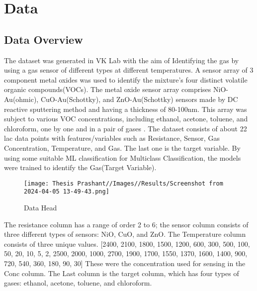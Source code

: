 
\chapter{Data}

\section{ Data Overview}
The dataset was generated in VK Lab with the aim of Identifying the gas by using a gas sensor of different types at different temperatures. A sensor array of 3 component metal oxides was used to identify the mixture's four distinct volatile organic compounds(VOCs). The metal oxide sensor array comprises NiO-Au(ohmic), CuO-Au(Schottky), and ZnO-Au(Schottky) sensors made by DC reactive sputtering method and having a thickness of 80-100nm. This array was subject to various VOC concentrations, including ethanol, acetone, toluene, and chloroform, one by one and in a pair of gases \cite{singh2024metal}. The dataset consists of about 22 lac data points with features/variables such as Resistance, Sensor, Gas Concentration, Temperature, and Gas. The last one is the target variable. By using some suitable ML classification for Multiclass Classification, the models were trained to identify the Gas(Target Variable).
\begin{figure}
    \centering
    \texttt{[image: Thesis Prashant//Images//Results/Screenshot from 2024-04-05 13-49-43.png]}
    \caption{Data Head}
    \label{fig:enter-label}
\end{figure}

The resistance column has a range of order 2 to 6; the sensor column consists of three different types of sensors: NiO, CuO, and ZnO. The Temperature column consists of three unique values. 
[2400, 2100, 1800, 1500, 1200,  600,  300,  500,  100,   50,   20,
         10,    5,    2, 2500, 2000, 1000, 2700, 1900, 1700, 1550, 1370,
       1600, 1400,  900,  720,  540,  360,  180,   90,   30] These were the concentration used for sensing in the Conc column.
      The Last column is the target column, which has four types of gases: ethanol, acetone, toluene, and chloroform.

